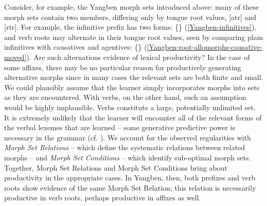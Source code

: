 Consider, for example, the Yangben morph sets introduced above: many of these morph sets contain two members, differing only by tongue root values, [atr] and [rtr]. For example, the infinitive prefix has two forms: \{\} (\ref{Yangben-infinitives}), and verb roots may alternate in their tongue root values, seen by comparing plain infinitives with causatives and agentives: \{\} (\ref{Yangben-root-allomorphs-causative-moved}). Are such alternations evidence of lexical productivity? In the case of some affixes, there may be no particular reason for productively generating alternative morphs since in many cases the relevant sets are both finite and small. We could plausibly assume that the learner simply incorporates morphs into sets as they are encountered. With verbs, on the other hand, such an assumption would be highly implausible. Verbs constitute a large, potentially unlimited set. It is extremely unlikely that the learner will encounter all of the relevant forms of the verbal lexemes that are learned -- some generative predictive power is necessary in the grammar (cf. \citealt{Ford+:1983}). We account for the observed regularities with \textit{Morph Set Relations} -- which define the systematic relations between related morphs -- and \textit{Morph Set Conditions} -- which identify sub-optimal morph sets. Together, Morph Set Relations and Morph Set Conditions bring about productivity in the appropriate cases. In Yangben, then, both prefixes and verb roots show evidence of the same Morph Set Relation; this relation is necessarily productive in verb roots, perhaps productive in affixes as well.

